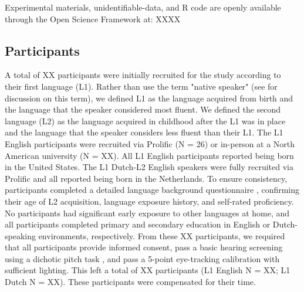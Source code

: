 Experimental materials, unidentifiable-data, and R code are openly available through the Open Science Framework at: XXXX


\subsection{Participants}
A total of XX participants were initially recruited for the study according to their first language (L1). Rather than use the term "native speaker" (see \cite{Brown_Tusmagambet_Rahming_Tu_DeSalvo_Wiener_2023} for discussion on this term), we defined L1 as the language acquired from birth and the language that the speaker considered most fluent. We defined the second language (L2) as the language acquired in childhood after the L1 was in place and the language that the speaker considers less fluent than their L1. The L1 English participants were recruited via Prolific (N = 26) or in-person at a North American university (N = XX). All L1 English participants reported being born in the United States. The L1 Dutch-L2 English speakers were fully recruited via Prolific and all reported being born in the Netherlands. To ensure consistency, participants completed a detailed language background questionnaire \citep{Marian_Blumenfeld_Kaushanskaya_2007}, confirming their age of L2 acquisition, language exposure history, and self-rated proficiency. No participants had significant early exposure to other languages at home, and all participants completed primary and secondary education in English or Dutch-speaking environments, respectively. From these XX participants, we required that all participants provide informed consent, pass a basic hearing screening using a dichotic pitch task \citep{milne_2021}, and pass a 5-point eye-tracking calibration with sufficient lighting. This left a total of XX participants (L1 English N = XX; L1 Dutch N = XX). These participants were compensated for their time.

